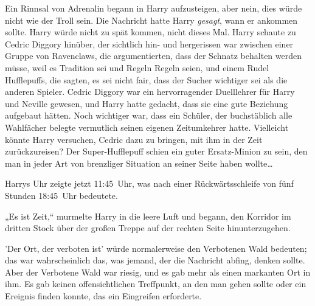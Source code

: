 Ein Rinnsal von Adrenalin begann in Harry aufzusteigen, aber nein, dies würde nicht wie der Troll sein. Die Nachricht hatte Harry \emph{gesagt}, wann er ankommen sollte.
Harry würde nicht zu spät kommen, nicht dieses Mal. Harry schaute zu Cedric Diggory hinüber, der sichtlich hin- und hergerissen war zwischen einer Gruppe von Ravenclaws, die argumentierten, dass der Schnatz behalten werden müsse, weil es Tradition sei und Regeln Regeln seien, und einem Rudel Hufflepuffs, die sagten, es sei nicht fair, dass der Sucher wichtiger sei als die anderen Spieler.
Cedric Diggory war ein hervorragender Duelllehrer für Harry und Neville gewesen, und Harry hatte gedacht, dass sie eine gute Beziehung aufgebaut hätten. Noch wichtiger war, dass ein Schüler, der buchstäblich alle Wahlfächer belegte vermutlich seinen eigenen Zeitumkehrer hatte. Vielleicht könnte Harry versuchen, Cedric dazu zu bringen, mit ihm in der Zeit zurückzureisen? Der Super-Hufflepuff schien ein guter Ersatz-Minion zu sein, den man in jeder Art von brenzliger Situation an seiner Seite haben wollte…


Harrys Uhr zeigte jetzt 11:45~Uhr, was nach einer Rückwärtsschleife von fünf Stunden 18:45~Uhr bedeutete.

„Es ist Zeit,“ murmelte Harry in die leere Luft und begann, den Korridor im dritten Stock über der großen Treppe auf der rechten Seite hinunterzugehen.

'Der Ort, der verboten ist' würde normalerweise den Verbotenen Wald bedeuten; das war wahrscheinlich das, was jemand, der die Nachricht abfing, denken sollte.
Aber der Verbotene Wald war riesig, und es gab mehr als einen markanten Ort in ihm. Es gab keinen offensichtlichen Treffpunkt, an den man gehen sollte oder ein Ereignis finden konnte, das ein Eingreifen erforderte.

